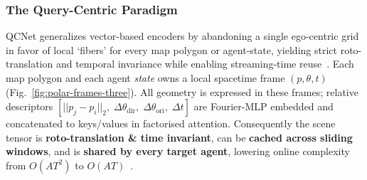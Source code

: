 
\subsubsection{The Query-Centric Paradigm}
\label{ssec:qc_paradigm}

QCNet generalizes vector-based encoders by abandoning a single ego-centric grid in favor of local `fibers' for every map polygon or agent-state, yielding strict roto-translation and temporal invariance while enabling streaming-time reuse~\cite{qcnetZhou2023}. Each map polygon and each agent \emph{state} owns a local spacetime frame \((p,\theta,t)\) (Fig.~\ref{fig:polar-frames-three}). All geometry is expressed in these frames; relative descriptors \([\lvert\lvert p_j-p_i\rvert\rvert_2,\;\Delta\theta_{\text{dir}},\;\Delta\theta_{\text{ori}},\;\Delta t]\) are Fourier-MLP embedded and concatenated to keys/values in factorised attention. Consequently the scene tensor is \textbf{roto-translation \& time invariant}, can be \textbf{cached across sliding windows}, and is \textbf{shared by every target agent}, lowering online complexity from \(O(AT^2)\) to \(O(AT)\)~\cite{qcnetZhou2023}.
